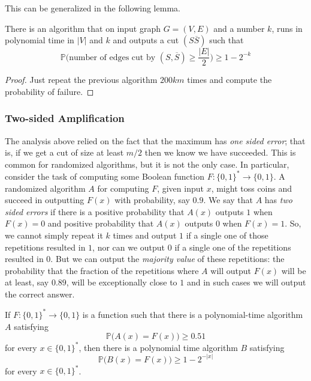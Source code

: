   This can be generalized in the following lemma. 

  \begin{lemma}
    \label{thm:randomized-max-cut-approximation}
  There is an algorithm that on input graph $G = (V, E)$ and a number $k$, runs in polynomial time in $|V|$ and $k$ and outputs a cut $(S \overline{S})$ such that
  \begin{equation}
    \mathbb{P}\Big(\text{number of edges cut by } (S, \overline{S}) \geq \frac{|E|}{2} \Big) \geq 1 - 2^{-k}
  \end{equation}
  \end{lemma}
  \begin{proof}
  Just repeat the previous algorithm $200km$ times and compute the probability of failure. 
  \end{proof}

  \subsubsection{Two-sided Amplification}
  The analysis above relied on the fact that the maximum has \textit{one sided error}; that is, if we get a cut of size at least $m/2$ then we know we have succeeded. This is common for randomized algorithms, but it is not the only case. In particular, consider the task of computing some Boolean function $F: \{0,1\}^* \to \{0,1\}$. A randomized algorithm $A$ for computing $F$, given input $x$, might toss coins and succeed in outputting $F(x)$ with probability, say $0.9$. We say that $A$ has \textit{two sided errors} if there is a positive probability that $A(x)$ outputs $1$ when $F(x) = 0$ and positive probability that $A(x)$ outputs $0$ when $F(x) = 1$. So, we cannot simply repeat it $k$ times and output $1$ if a single one of those repetitions resulted in $1$, nor can we output $0$ if a single one of the repetitions resulted in $0$. But we can output the \textit{majority value} of these repetitions: the probability that the fraction of the repetitions where $A$ will output $F(x)$ will be at least, say $0.89$, will be exceptionally close to $1$ and in such cases we will output the correct answer. 

  \begin{theorem}
    \label{thm:amplification-of-one-sided-error}
  If $F: \{0,1\}^* \to \{0,1\}$ is a function such that there is a polynomial-time algorithm $A$ satisfying 
  \begin{equation}
    \mathbb{P} \big( A(x) = F(x) \big) \geq 0.51
  \end{equation}
  for every $x \in \{0,1\}^*$, then there is a polynomial time algorithm $B$ satisfying
  \begin{equation}
    \mathbb{P} \big( B(x) = F(x) \big) \geq 1 - 2^{-|x|}
  \end{equation}
  for every $x \in \{0,1\}^*$. 
  \end{theorem}

